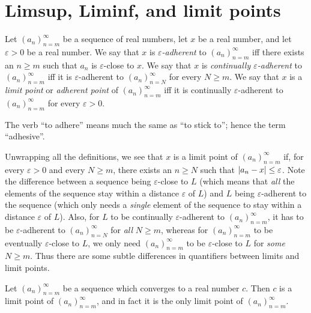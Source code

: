 \section{Limsup, Liminf, and limit points}\label{i:sec:6.4}

\begin{defn}\label{i:6.4.1}
  Let \((a_n)_{n = m}^\infty\) be a sequence of real numbers, let \(x\) be a real number, and let \(\varepsilon > 0\) be a real number.
  We say that \(x\) is \emph{\(\varepsilon\)-adherent} to \((a_n)_{n = m}^\infty\) iff there exists an \(n \geq m\) such that \(a_n\) is \(\varepsilon\)-close to \(x\).
  We say that \(x\) is \emph{continually \(\varepsilon\)-adherent} to \((a_n)_{n = m}^\infty\) iff it is \(\varepsilon\)-adherent to \((a_n)_{n = N}^\infty\) for every \(N \geq m\).
  We say that \(x\) is a \emph{limit point} or \emph{adherent point} of \((a_n)_{n = m}^\infty\) iff it is continually \(\varepsilon\)-adherent to \((a_n)_{n = m}^\infty\) for every \(\varepsilon > 0\).
\end{defn}

\begin{rmk}\label{i:6.4.2}
  The verb ``to adhere'' means much the same as ``to stick to'';
  hence the term ``adhesive''.
\end{rmk}

\begin{note}
  Unwrapping all the definitions, we see that \(x\) is a limit point of \((a_n)_{n = m}^\infty\) if, for every \(\varepsilon > 0\) and every \(N \geq m\), there exists an \(n \geq N\) such that \(\left\lvert a_n - x\right\rvert \leq \varepsilon\).
  Note the difference between a sequence being \(\varepsilon\)-close to \(L\)
  (which means that \emph{all} the elements of the sequence stay within a distance \(\varepsilon\) of \(L\))
  and \(L\) being \(\varepsilon\)-adherent to the sequence
  (which only needs a \emph{single} element of the sequence to stay within a distance \(\varepsilon\) of \(L\)).
  Also, for \(L\) to be continually \(\varepsilon\)-adherent to \((a_n)_{n = m}^\infty\), it has to be \(\varepsilon\)-adherent to \((a_n)_{n = N}^\infty\) for \emph{all} \(N \geq m\), whereas for \((a_n)_{n = m}^\infty\) to be eventually \(\varepsilon\)-close to \(L\), we only need \((a_n)_{n = m}^\infty\) to be \(\varepsilon\)-close to \(L\) for \emph{some} \(N \geq m\).
  Thus there are some subtle differences in quantifiers between limits and limit points.
\end{note}

\setcounter{thm}{4}
\begin{prop}\label{i:6.4.5}
  Let \((a_n)_{n = m}^\infty\) be a sequence which converges to a real number \(c\).
  Then \(c\) is a limit point of \((a_n)_{n = m}^\infty\), and in fact it is the only limit point of \((a_n)_{n = m}^\infty\).
\end{prop}

